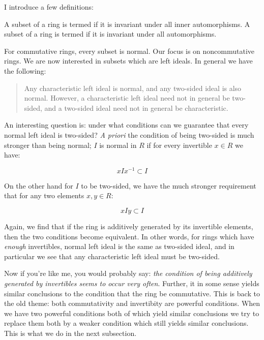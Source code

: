 \documentclass[a4paper]{amsart}
\begin{document}
I introduce a few definitions:

\begin{definer}
  A subset of a ring is termed  if it
  is invariant under all inner automorphisms. A subset of a ring is
  termed  if it is invariant
  under all automorphisms.
\end{definer}

For commutative rings, every subset is normal. Our focus is on
noncommutative rings. We are now interested in subsets which are left
ideals. In general we have the following:

\begin{quote}
  Any characteristic left ideal is normal, and any two-sided ideal
  is also normal. However, a characteristic left ideal need not in
  general be two-sided, and a two-sided ideal need not in general be
  characteristic.
\end{quote}

An interesting question is: under what conditions can we guarantee
that every normal left ideal is two-sided? {\em A priori} the
condition of being two-sided is much stronger than being normal; $I$
is normal in $R$ if for every invertible $x \in R$ we have:

$$xIx^{-1} \subset I$$

On the other hand for $I$ to be two-sided, we have the much stronger
requirement that for any two elements $x,y \in R$:

$$xIy \subset I$$

Again, we find that if the ring is additively generated by its
invertible elements, then the two conditions become equivalent. In
other words, for rings which have {\em enough} invertibles, normal
left ideal is the same as two-sided ideal, and in particular we see
that any characteristic left ideal must be two-sided.

Now if you're like me, you would probably say: {\em the condition of
  being additively generated by invertibles seems to occur very
  often}. Further, it in some sense yields similar conclusions to the
condition that the ring be commutative. This is back to the old theme:
both commutativity and invertibity are powerful conditions. When we
have two powerful conditions both of which yield similar conclusions
we try to replace them both by a weaker condition which still yields
similar conclusions. This is what we do in the next subsection.
\end{document}
